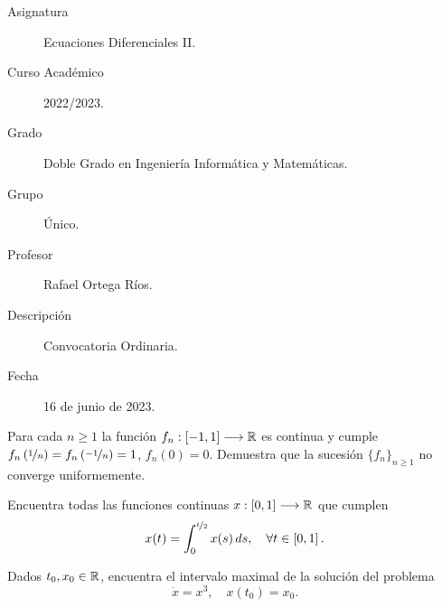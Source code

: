 \documentclass[12pt]{article}
\begin{document}

    
    

    \begin{description}
        \item[Asignatura] Ecuaciones Diferenciales II.
        \item[Curso Académico] 2022/2023.
        \item[Grado] Doble Grado en Ingeniería Informática y Matemáticas.
        \item[Grupo] Único.
        \item[Profesor] Rafael Ortega Ríos.
        \item[Descripción] Convocatoria Ordinaria.
        \item[Fecha] 16 de junio de 2023.
    \end{description}
    \newpage


    
    \begin{ejercicio}
        Para cada $n \geq 1$ la función $f_n : \left[-1, 1\right] \longrightarrow \mathbb{R}$ es continua y cumple $f_n\left(\nicefrac{1}{n}\right) = f_n\left(\nicefrac{-1}{n}\right) = 1$, $f_n(0) = 0$. Demuestra que la sucesión $\{f_n\}_{n \geq 1}$ no converge uniformemente.
    \end{ejercicio}

    \begin{ejercicio}
        Encuentra todas las funciones continuas $x : \left[0, 1\right] \longrightarrow \mathbb{R}$ que cumplen
        \[
        x(t) = \int_{0}^{\nicefrac{t}{2}} x(s) \, ds, \quad \forall t \in \left[0, 1\right].
        \]
    \end{ejercicio}

    \begin{ejercicio}
        Dados $t_0, x_0 \in \mathbb{R}$, encuentra el intervalo maximal de la solución del problema
        \[
        \dot{x} = x^3, \quad x(t_0) = x_0.
        \]
    \end{ejercicio}
\end{document}
